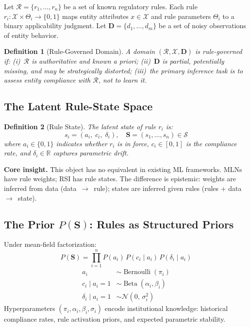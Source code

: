 \documentclass[letterpaper]{article}
\newtheorem{definition}{Definition}
\begin{document}
Let $\mathcal{R} = \{r_1, \ldots, r_n\}$ be a set of known regulatory
rules. Each rule $r_i : \mathcal{X} \times \Theta_i \to \{0,1\}$ maps
entity attributes $x \in \mathcal{X}$ and rule parameters $\Theta_i$
to a binary applicability judgment. Let
$\mathbf{D} = \{d_1, \ldots, d_m\}$ be a set of noisy observations of
entity behavior.

\begin{definition}[Rule-Governed Domain]
A domain $(\mathcal{R}, \mathcal{X}, \mathbf{D})$ is \emph{rule-governed}
if: (i)~$\mathcal{R}$ is authoritative and known a priori;
(ii)~$\mathbf{D}$ is partial, potentially missing, and may be
strategically distorted; (iii)~the primary inference task is to assess
entity compliance with $\mathcal{R}$, not to learn it.
\end{definition}

\subsection{The Latent Rule-State Space}

\begin{definition}[Rule State]
The latent state of rule $r_i$ is:
\[
  s_i = (a_i,\; c_i,\; \delta_i), \quad
  \mathbf{S} = (s_1, \ldots, s_n) \in \mathcal{S}
\]
where $a_i \in \{0,1\}$ indicates whether $r_i$ is in force,
$c_i \in [0,1]$ is the compliance rate, and $\delta_i \in \mathbb{R}$
captures parametric drift.
\end{definition}

\noindent\textbf{Core insight.} This object has no equivalent in
existing ML frameworks. MLNs have rule weights; RSI has rule states.
The difference is epistemic: weights are inferred from data
(data~$\to$~rule); states are inferred given rules
(rules + data~$\to$~state).

\subsection{The Prior $P(\mathbf{S})$: Rules as Structured Priors}

Under mean-field factorization:
\[
  P(\mathbf{S}) = \prod_{i=1}^n P(a_i)\, P(c_i \mid a_i)\, P(\delta_i \mid a_i)
\]
\begin{align}
  a_i &\sim \operatorname{Bernoulli}(\pi_i) \\
  c_i \mid a_i{=}1 &\sim \operatorname{Beta}(\alpha_i, \beta_i) \\
  \delta_i \mid a_i{=}1 &\sim \mathcal{N}(0,\, \sigma_i^2)
\end{align}
Hyperparameters $(\pi_i, \alpha_i, \beta_i, \sigma_i)$ encode
institutional knowledge: historical compliance rates, rule activation
priors, and expected parametric stability.
\end{document}
